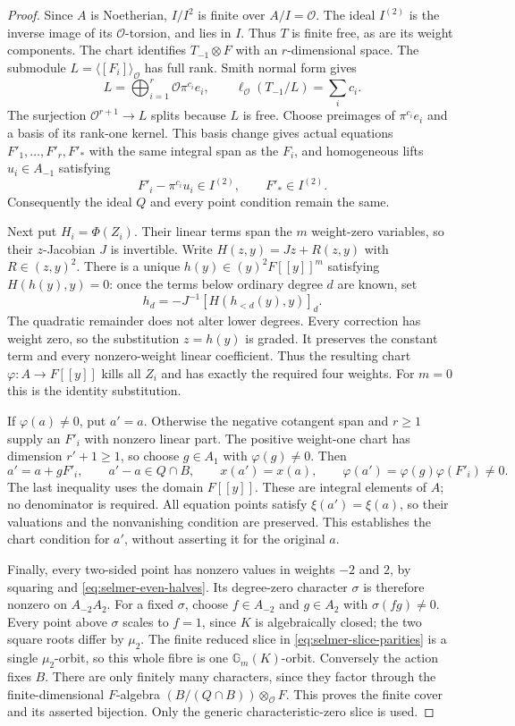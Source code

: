 \begin{proof}
Since $A$ is Noetherian, $I/I^2$ is finite over
$A/I=\mathcal O$. The ideal $I^{(2)}$ is the inverse image of its
$\mathcal O$-torsion, and lies in $I$. Thus $T$ is finite free,
as are its weight components. The chart identifies
$T_{-1}\otimes F$ with an $r$-dimensional space. The submodule
$L=\langle[F_i]\rangle_{\mathcal O}$ has full rank. Smith normal
form gives
\[
 L=\bigoplus_{i=1}^r\mathcal O\pi^{c_i}e_i,\qquad
 \ell_{\mathcal O}(T_{-1}/L)=\sum_i c_i.
\]
The surjection $\mathcal O^{r+1}\to L$ splits because $L$ is free.
Choose preimages of $\pi^{c_i}e_i$ and a basis of its rank-one
kernel. This basis change gives actual equations
$F'_1,\ldots,F'_r,F'_*$ with the same integral span as the $F_i$,
and homogeneous lifts $u_i\in A_{-1}$ satisfying
\[
 F'_i-\pi^{c_i}u_i\in I^{(2)},\qquad F'_*\in I^{(2)}.
\]
Consequently the ideal $Q$ and every point condition remain the same.

Next put $H_i=\Phi(Z_i)$. Their linear terms span the $m$
weight-zero variables, so their $z$-Jacobian $J$ is invertible.
Write $H(z,y)=Jz+R(z,y)$ with $R\in(z,y)^2$. There is a unique
$h(y)\in(y)^2F[[y]]^m$ satisfying $H(h(y),y)=0$: once the terms
below ordinary degree $d$ are known, set
\[
 h_d=-J^{-1}[H(h_{<d}(y),y)]_d.
\]
The quadratic remainder does not alter lower degrees. Every
correction has weight zero, so the substitution $z=h(y)$ is graded.
It preserves the constant term and every nonzero-weight linear
coefficient. Thus the resulting chart $\varphi:A\to F[[y]]$
kills all $Z_i$ and has exactly the required four weights.
For $m=0$ this is the identity substitution.

If $\varphi(a)\ne0$, put $a'=a$. Otherwise the negative cotangent
span and $r\ge1$ supply an $F'_i$ with nonzero linear part.
The positive weight-one chart has dimension $r'+1\ge1$, so choose
$g\in A_1$ with $\varphi(g)\ne0$. Then
\[
 a'=a+gF'_i,\qquad a'-a\in Q\cap B,\qquad x(a')=x(a),\qquad
 \varphi(a')=\varphi(g)\varphi(F'_i)\ne0.
\]
The last inequality uses the domain $F[[y]]$. These are integral
elements of $A$; no denominator is required. All equation points
satisfy $\xi(a')=\xi(a)$, so their valuations and the nonvanishing
condition are preserved. This establishes the chart condition for
$a'$, without asserting it for the original $a$.

Finally, every two-sided point has nonzero values in weights $-2$
and $2$, by squaring and \eqref{eq:selmer-even-halves}. Its
degree-zero character $\sigma$ is therefore nonzero on
$A_{-2}A_2$. For a fixed $\sigma$, choose $f\in A_{-2}$ and
$g\in A_2$ with $\sigma(fg)\ne0$. Every point above $\sigma$
scales to $f=1$, since $K$ is algebraically closed; the two square
roots differ by $\mu_2$. The finite reduced slice in
\eqref{eq:selmer-slice-parities} is a single $\mu_2$-orbit, so this
whole fibre is one $\mathbb G_m(K)$-orbit. Conversely the action
fixes $B$. There are only finitely many characters, since they factor
through the finite-dimensional $F$-algebra
$(B/(Q\cap B))\otimes_{\mathcal O}F$. This proves the finite cover
and its asserted bijection. Only the generic characteristic-zero
slice is used.


\end{proof}
